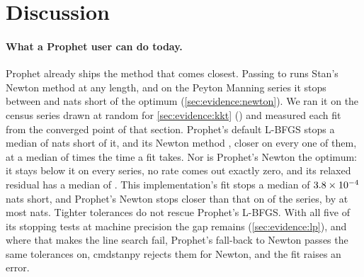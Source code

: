 \section{Discussion}
\label{sec:discussion}

\paragraph{What a Prophet user can do today.}
Prophet already ships the method that comes closest. Passing
 to  runs Stan's Newton method at any length, and
on the Peyton Manning series it stops between \NewtonStanMin{} and \NewtonStanMax{}
nats short of the optimum (\cref{sec:evidence:newton}). We ran it on the
\NewtonCensusSeries{} census series drawn at random for \cref{sec:evidence:kkt}
() and measured each fit from the converged
point of that section. Prophet's default L-BFGS stops a median of
\NewtonCensusLbfgsMedian{} nats short of it, and its Newton method
\NewtonCensusNewtonMedian, closer on every one of them, at a median of
\NewtonCensusTimeRatio{} times the time a fit takes. Nor is Prophet's Newton the
optimum: it stays below it on every series, no rate comes out exactly zero, and its
relaxed residual has a median of \NewtonCensusRelaxedMedian. This implementation's
fit stops a median of $3.8\times10^{-4}$ nats short, and Prophet's Newton stops
closer than that on \NewtonCensusAbove{} of the series, by at most
\NewtonCensusAboveMax{} nats. Tighter tolerances do not rescue Prophet's L-BFGS.
With all five of its stopping tests at machine precision the gap remains
(\cref{sec:evidence:lp}), and where that makes the line search fail, Prophet's
fall-back to Newton passes the same tolerances on, cmdstanpy rejects them for Newton,
and the fit raises an error.

